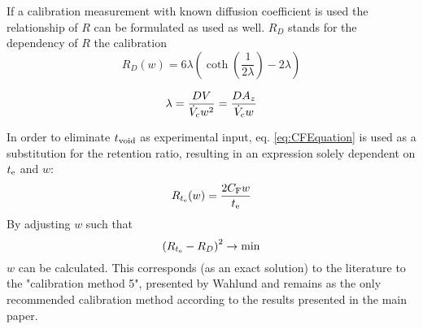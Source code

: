 If a calibration measurement with known diffusion coefficient is used the relationship of $R$ can be formulated as used 
as well. $R_D$ stands for the dependency of $R$ the calibration
\begin{equation}
R_D(w) = 6\lambda \left( \coth{\left( \frac{1}{2\lambda} \right) } - 2\lambda \right)
\end{equation}

\begin{equation}
\lambda = \frac{D V}{\dot{V}_\text{c} w^2} = \frac{D A_z}{\dot{V}_\text{c} w}
\end{equation}

In order to eliminate $t_\text{void}$ as experimental input, eq. \ref{eq:CFEquation} is used as a substitution for the 
retention ratio, resulting in an expression solely dependent on $t_\text{e}$ and $w$:
\begin{equation}
R_{t_\text{e}}(w) = \frac{2 C_\text{F} w}{t_\text{e}}
\end{equation}
By adjusting $w$ such that \[\left( R_{t_\text{e}} - R_D \right)^2 \rightarrow \min\]
$w$ can be calculated. This corresponds (as an exact solution) to the literature to the "calibration method 5", 
presented by Wahlund  and remains as the only recommended calibration method according to the 
results presented in the main paper.